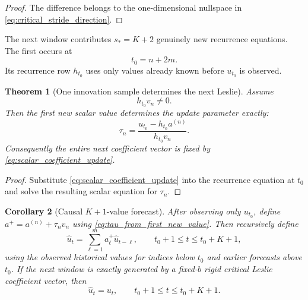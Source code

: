 \documentclass[11pt]{amsart}
\numberwithin{equation}{section}
\theoremstyle{plain}
\newtheorem{theorem}{Theorem}[section]
\newtheorem{corollary}[theorem]{Corollary}
\theoremstyle{definition}
\theoremstyle{remark}
\begin{document}
\begin{proof}
The difference belongs to the one-dimensional nullspace in \eqref{eq:critical_stride_direction}.
\end{proof}

The next window contributes $s_*=K+2$ genuinely new recurrence equations.  The first occurs at
\begin{equation}
t_0=n+2m.
\label{eq:first_new_time}
\end{equation}
Its recurrence row $h_{t_0}$ uses only values already known before $u_{t_0}$ is observed.

\begin{theorem}[One innovation sample determines the next Leslie]
\label{thm:one_sample_determines_update}
Assume
\begin{equation}
h_{t_0}v_n\neq0.
\label{eq:innovation_observability}
\end{equation}
Then the first new scalar value determines the update parameter exactly:
\begin{equation}
\boxed{
\tau_n
=
\frac{u_{t_0}-h_{t_0}a^{(n)}}{h_{t_0}v_n}.
}
\label{eq:tau_from_first_new_value}
\end{equation}
Consequently the entire next coefficient vector is fixed by \eqref{eq:scalar_coefficient_update}.
\end{theorem}

\begin{proof}
Substitute \eqref{eq:scalar_coefficient_update} into the recurrence equation at $t_0$ and solve the resulting scalar equation for $\tau_n$.
\end{proof}

\begin{corollary}[Causal $K+1$-value forecast]
\label{cor:causal_Kplus1_forecast}
After observing only $u_{t_0}$, define $a^+=a^{(n)}+\tau_nv_n$ using \eqref{eq:tau_from_first_new_value}.  Then recursively define
\begin{equation}
\widehat u_t
=
\sum_{\ell=1}^{m}a^+_\ell\widehat u_{t-\ell},
\qquad
t_0+1\leq t\leq t_0+K+1,
\label{eq:causal_recursive_forecast}
\end{equation}
using the observed historical values for indices below $t_0$ and earlier forecasts above $t_0$.  If the next window is exactly generated by a fixed-$b$ rigid critical Leslie coefficient vector, then
\begin{equation}
\widehat u_t=u_t,
\qquad
t_0+1\leq t\leq t_0+K+1.
\label{eq:exact_Kplus1_forecast}
\end{equation}
\end{corollary}
\end{document}
